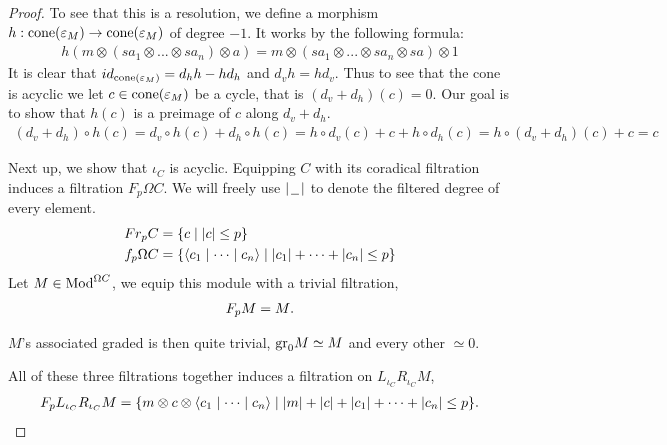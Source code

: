 \documentclass[../thesis.tex]{subfiles}
\begin{document}
\begin{proof}
                To see that this is a resolution, we define a morphism $h: \tt{cone}(\varepsilon_M) \rightarrow \tt{cone}(\varepsilon_M)$ of degree $-1$. It works by the following formula:
                \begin{align*}
                    h(m \otimes (sa_1 \otimes ... \otimes sa_n) \otimes a) = m \otimes (sa_1 \otimes ... \otimes sa_n \otimes sa) \otimes 1
                \end{align*}
                It is clear that $id_{\tt{cone}(\varepsilon_M)} = d_hh - hd_h$ and $d_vh = hd_v$. Thus to see that the cone is acyclic we let $c\in \tt{cone}(\varepsilon_M)$ be a cycle, that is $(d_v + d_h)(c) = 0$. Our goal is to show that $h(c)$ is a preimage of $c$ along $d_v + d_h$.
                \begin{multline*}
                    (d_v + d_h)\circ h(c) = d_v\circ h(c) + d_h\circ h(c) = h\circ d_v(c) + c + h\circ d_h(c) = h\circ (d_v + d_h)(c) + c = c
                \end{multline*}

                Next up, we show that $\iota_C$ is acyclic. Equipping $C$ with its coradical filtration induces a filtration $F_p\Omega C$. We will freely use $|\argument |$ to denote the filtered degree of every element.
                \begin{align*}
                    Fr_pC & = \startset{c \mid |c| \leq p} \\
                    f_p\Omega C & = \startset{\langle c_1 \mid \cdots \mid c_n \rangle \mid |c_1| + \cdots + |c_n| \leq p }
                \end{align*}
                Let $M \in \tt{Mod}^{\Omega C}$, we equip this module with a trivial filtration,
                \begin{align*}
                    F_pM = M\tt{.}
                \end{align*}

                $M$'s associated graded is then quite trivial, $\tt{gr}_0M \simeq M$ and every other $\simeq 0$.

                All of these three filtrations together induces a filtration on $L_{\iota_C}R_{\iota_C}M$,
                \begin{align*}
                    F_pL_{\iota_C}R_{\iota_C}M = \startset{m \otimes c \otimes \langle c_1 \mid \cdots \mid c_n \rangle \mid |m| + |c| + |c_1| + \cdots + |c_n| \leq p}\tt{.}
                \end{align*}


\end{proof}
\end{document}
